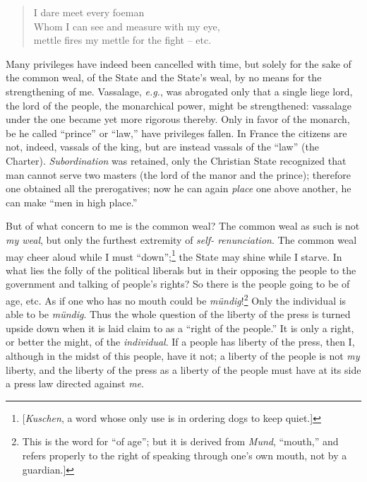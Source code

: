 \begin{quotation}

\noindent{} I dare meet every foeman\\
 Whom I can see and measure with my eye,\\
 mettle fires my mettle for the fight -- etc. \end{quotation}

\noindent{}Many privileges have indeed been cancelled with time, but solely 
for the sake of the common weal, of the State and the State's weal, by no 
means for the strengthening of me. Vassalage, \textit{e.g.}, was abrogated 
only that a single liege lord, the lord of the people, the monarchical power, 
might be strengthened: vassalage under the one became yet more rigorous 
thereby. Only in favor of the monarch, be he called ``prince'' or ``law,'' 
have privileges fallen. In France the citizens are not, indeed, vassals of the 
king, but are instead vassals of the ``law'' (the Charter). 
\textit{Subordination} was retained, only the Christian State recognized that 
man cannot serve two masters (the lord of the manor and the prince); therefore 
one obtained all the prerogatives; now he can again \textit{place} one above 
another, he can make ``men in high place.''

But of what concern to me is the common weal? The common weal as such is not 
\textit{my weal}, but only the furthest extremity of \textit{self- 
renunciation}. The common weal may cheer aloud while I must 
``down'';\footnote{[\textit{Kuschen}, a word whose only use is in ordering 
dogs to keep quiet.]} the State may shine while I starve. In what lies the 
folly of the political liberals but in their opposing the people to the 
government and talking of people's rights? So there is the people going to be 
of age, etc. As if one who has no mouth could be 
\textit{m\"undig}!\footnote{This is the word for ``of age''; but it is 
derived from \textit{Mund}, ``mouth,'' and refers properly to the right of 
speaking through one's own mouth, not by a guardian.]} Only the individual is 
able to be \textit{m\"undig}. Thus the whole question of the liberty of the 
press is turned upside down when it is laid claim to as a ``right of the 
people.'' It is only a right, or better the might, of the 
\textit{individual}. If a people has liberty of the press, then I, although in 
the midst of this people, have it not; a liberty of the people is not 
\textit{my} liberty, and the liberty of the press as a liberty of the people 
must have at its side a press law directed against \textit{me}.

